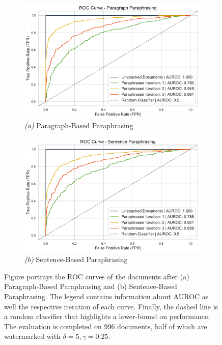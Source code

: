 \documentclass{l4proj}
\theoremstyle{definition}
\begin{document}
    \begin{figure}[ht]
        \centering
        \captionsetup[subfigure]{labelformat=empty}
        \begin{subfigure}{.495\textwidth}
            \centering
            \includegraphics[width=\linewidth]{images/results/roc/roc-curve-para.pdf}
            \caption{\emph{(a)} Paragraph-Based Paraphrasing}
            \label{fig:para-roc}
        \end{subfigure}
        \begin{subfigure}{.495\textwidth}
            \centering
            \includegraphics[width=\linewidth]{images/results/roc/roc-curve-sent.pdf}
            \caption{\emph{(b)} Sentence-Based Paraphrasing}
            \label{fig:sent-roc}
        \end{subfigure}
        \caption{Figure portrays the ROC curves of the documents after (a) Paragraph-Based Paraphrasing and (b) Sentence-Based Paraphrasing. The legend contains information about AUROC as well the respective iteration of each curve. Finally, the dashed line is a random classifier that highlights a lower-bound on performance. The evaluation is completed on 996 documents, half of which are watermarked with $\delta = 5, \gamma = 0.25$.}
        \label{fig:roc-para-sent-comparison}
    \end{figure}
\end{document}
